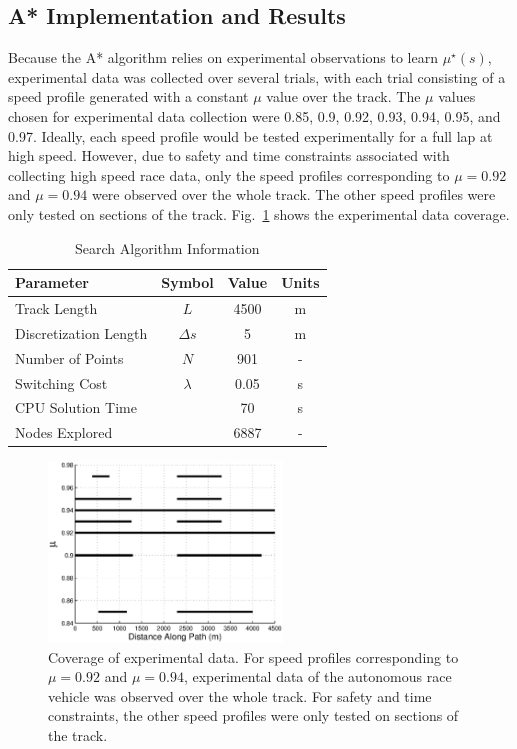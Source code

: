 \documentclass[9pt,shortpaper,twoside,web]{ieeecolor}
\begin{document}
{{{\subsection{A* Implementation and Results}

Because the A* algorithm relies on experimental observations to learn $\mu^\star(s)$, experimental data was collected over several trials, with
each trial consisting of a speed profile generated with a constant $\mu$ value over the track. The $\mu$ values chosen for
experimental data collection were 0.85, 0.9, 0.92, 0.93, 0.94, 0.95, and 0.97. Ideally, each speed profile would be tested experimentally for a 
full lap at high speed. However, due to safety and time constraints associated with collecting high speed race data, only the speed profiles corresponding to $\mu = 0.92$ and $\mu = 0.94$ were observed
over the whole track. The other speed profiles were only tested on sections of the track. Fig.~\ref{fig:muCoverage} shows the experimental data coverage. 

\begin{table}[h]
\begin{center}
\caption{Search Algorithm Information}\label{tb:astarparams}
\begin{tabular}{lccc}
Parameter & Symbol & Value & Units \\\hline
Track Length       & $L$           &  4500 & $\mathrm{m} $ \\
Discretization Length               & $\Delta s$  & 5 & $\mathrm{m}$\\
Number of Points  & $N$                        & 901 & -\\
Switching Cost          & $\lambda$                        & 0.05   & s\\\hline
CPU Solution Time           &                                  &  70    & s \\
Nodes Explored              &                                  &  6887  & - \\\hline
\end{tabular}
\end{center}
\end{table}

 \begin{figure}[tb]
\centering
\includegraphics[width=2.45in]{figures/muCoverage.eps}
\caption[Coverage of experimental data]{Coverage of experimental data. For speed profiles corresponding to $\mu = 0.92$ and $\mu = 0.94$, experimental data of the autonomous race vehicle was observed
over the whole track. For safety and time constraints, the other speed profiles were only tested on sections of the track.}
\label{fig:muCoverage}
\end{figure} 

}}}
\end{document}
